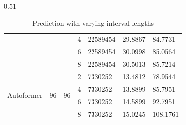 \begin{table}[h]
\begin{subtable}{0.51\textwidth}
{\begin{tabular}{cccllll}
                                        &                         &                          & 4   & 22589454                                   & 29.8867                                   & 84.7731                                       \\
                                        &                         &                          & 6   & 22589454                                   & 30.0998                                   & 85.0564                                       \\
                                        &                         &                          & 8   & 22589454                                   & 30.5013                                   & 85.7214                                       \\
                                        \midrule
            \multirow{4}{*}{Autoformer} & \multirow{4}{*}{96}     & \multirow{4}{*}{96}      & 2   & 7330252                                    & 13.4812                                  & 78.9544                                       \\
                                        &                         &                          & 4   & 7330252                                    & 13.8899                                   & 85.7951                                       \\
                                        &                         &                          & 6   & 7330252                                    & 14.5899                                   & 92.7951                                       \\
                                        &                         &                          & 8   & 7330252                                    & 15.0245                                   & 108.1761 \\
                                        \bottomrule
            \end{tabular}}
        \caption{Prediction with varying interval lengths}

    \end{subtable}

\end{table}









